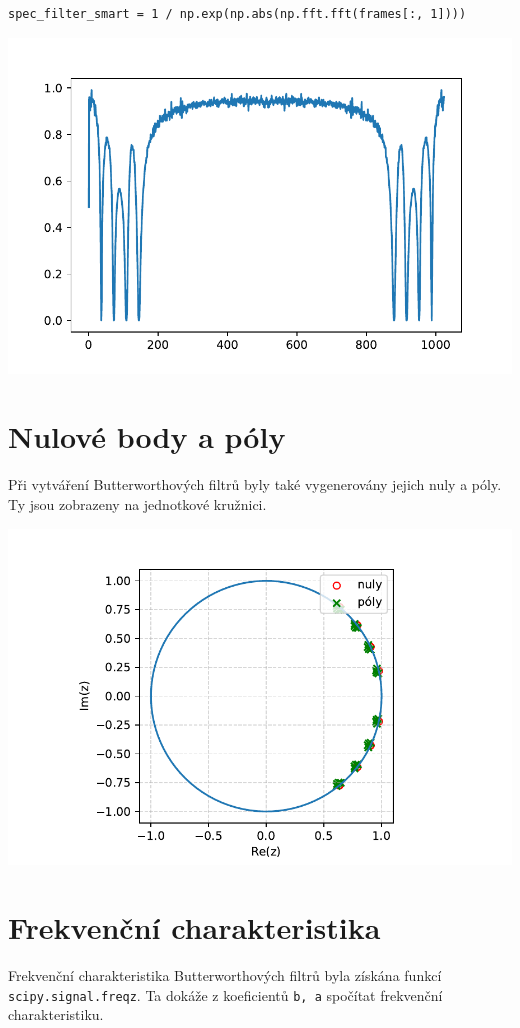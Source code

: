 \documentclass[12pt,a4paper]{article}
\begin{document}
		\begin{verbatim}
spec_filter_smart = 1 / np.exp(np.abs(np.fft.fft(frames[:, 1])))
		\end{verbatim}
		
		\includegraphics{img/filter_spec.pdf}
		
		\newpage
	
	\section{Nulové body a póly}
		Při vytváření Butterworthových filtrů byly také vygenerovány jejich nuly a póly.
		Ty jsou zobrazeny na jednotkové kružnici.
		
		\includegraphics{img/zplane.pdf}
		
		\newpage
	
	
	\section{Frekvenční charakteristika}
		Frekvenční charakteristika Butterworthových filtrů byla získána funkcí \texttt{scipy.signal.freqz}. Ta dokáže z koeficientů \texttt{b, a} spočítat frekvenční charakteristiku.
		
\end{document}
